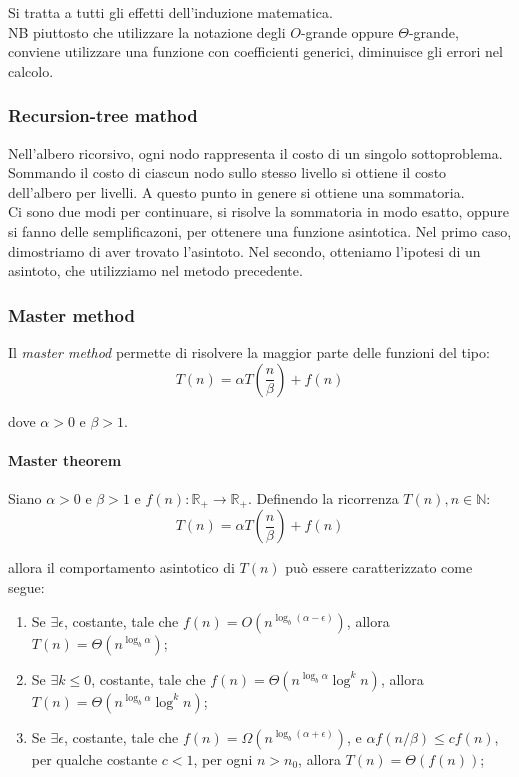 \documentclass{article}
\begin{document}
Si tratta a tutti gli effetti dell'induzione matematica.\\
NB piuttosto che utilizzare la notazione degli $O$-grande oppure
$\Theta$-grande, conviene utilizzare una funzione con coefficienti generici,
diminuisce gli errori nel calcolo. 

\subsubsection{Recursion-tree mathod}
Nell'albero ricorsivo, ogni nodo rappresenta il costo di un singolo
sottoproblema. Sommando il costo di ciascun nodo sullo stesso livello si ottiene
il costo dell'albero per livelli. A questo punto in genere si ottiene una
sommatoria.\\
Ci sono due modi per continuare, si risolve la sommatoria in modo esatto, oppure
si fanno delle semplificazoni, per ottenere una funzione asintotica. Nel primo
caso, dimostriamo di aver trovato l'asintoto. Nel secondo, otteniamo l'ipotesi
di un asintoto, che utilizziamo nel metodo precedente.

\subsubsection{Master method}
Il \textit{master method} permette di risolvere la maggior parte delle funzioni
del tipo: 
\begin{equation}
    T(n) = \alpha T(\frac{n}{\beta}) + f(n)
\end{equation}

dove $\alpha > 0 $ e $\beta > 1 $.

\paragraph{Master theorem} Siano $ \alpha > 0 $ e $ \beta > 1 $ e $f(n):
\mathbb{R}_+ \rightarrow \mathbb{R}_+$. Definendo la ricorrenza $T(n), n \in
\mathbb{N}$:
\begin{equation*}
    T(n) = \alpha T(\frac{n}{\beta}) + f(n)
\end{equation*}

allora il comportamento asintotico di $T(n)$ può essere caratterizzato come
segue:
\begin{enumerate}
    \item Se $\exists \epsilon $, costante, tale che $f(n) = O(n^{\log_b(\alpha -
        \epsilon)})$, allora $T(n) = \Theta(n^{\log_b \alpha})$;

    \item Se $\exists k \leq 0 $, costante, tale che $f(n) = \Theta(n^{\log_b \alpha} 
        \log^kn)$, allora $T(n) = \Theta(n^{\log_b \alpha} \log^kn)$;

    \item Se $\exists \epsilon $, costante, tale che $f(n) = \Omega(n^{\log_b(\alpha +
        \epsilon)})$, e $\alpha f(n/ \beta) \leq cf(n) $, per qualche costante
        $c< 1$, per ogni $n>n_0$, allora $T(n) = \Theta(f(n))$;

\end{enumerate}
\end{document}
